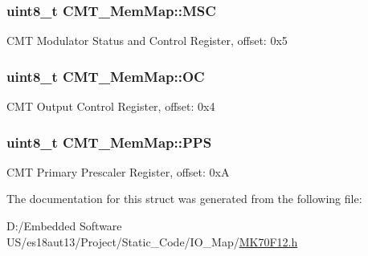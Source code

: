 \subsubsection[{M\+S\+C}]{\setlength{\rightskip}{0pt plus 5cm}uint8\+\_\+t C\+M\+T\+\_\+\+Mem\+Map\+::\+M\+S\+C}\label{struct_c_m_t___mem_map_ad1905c6966e1ac635348ce19d5c44ae9}
C\+M\+T Modulator Status and Control Register, offset\+: 0x5 \hypertarget{struct_c_m_t___mem_map_a67d3243d0c24b20b493fd919433dd84c}{}
\subsubsection[{O\+C}]{\setlength{\rightskip}{0pt plus 5cm}uint8\+\_\+t C\+M\+T\+\_\+\+Mem\+Map\+::\+O\+C}\label{struct_c_m_t___mem_map_a67d3243d0c24b20b493fd919433dd84c}
C\+M\+T Output Control Register, offset\+: 0x4 \hypertarget{struct_c_m_t___mem_map_a3a70b1ee9e4f0c56e0b2f48e059e1590}{}
\subsubsection[{P\+P\+S}]{\setlength{\rightskip}{0pt plus 5cm}uint8\+\_\+t C\+M\+T\+\_\+\+Mem\+Map\+::\+P\+P\+S}\label{struct_c_m_t___mem_map_a3a70b1ee9e4f0c56e0b2f48e059e1590}
C\+M\+T Primary Prescaler Register, offset\+: 0x\+A 

The documentation for this struct was generated from the following file\+:\begin{DoxyCompactItemize}
\item 
D\+:/\+Embedded Software U\+S/es18aut13/\+Project/\+Static\+\_\+\+Code/\+I\+O\+\_\+\+Map/\hyperlink{_m_k70_f12_8h}{M\+K70\+F12.\+h}\end{DoxyCompactItemize}
